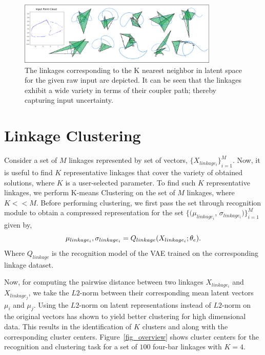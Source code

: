 \begin{figure}
\centering
\includegraphics[width=0.85\textwidth]{idetc-20/figure/fig_knn_latent.eps}
  \caption{The linkages corresponding to the K nearest neighbor in latent space for the given raw input are depicted. It can be seen that the linkages exhibit a wide variety in terms of their coupler path; thereby capturing input uncertainty.}
\label{fig_knn_latent}
\end{figure}

\section{Linkage Clustering}\label{subsec_vae_for_ln}
Consider a set of $M$ linkages represented by set of vectors, ${\{X_{linkage_{i}}\}}_{i=1}^{M}$.
Now, it is useful to find $K$ representative linkages that cover the variety of obtained solutions, where $K$ is a user-selected parameter.
To find such $K$ representative linkages, we perform K-means\cite{lloyd1982kmeans} Clustering on the set of $M$ linkages, where $K << M$.
Before performing clustering, we first pass the set through recognition module to obtain a compressed representation for the set $\{(\mu_{linkage_i}$, $\sigma_{linkage_i})\}_{i=1}^M$ given by,
\begin{equation}\label{eq_recogn_linkage}
  \mu_{linkage_i}, \sigma_{linkage_i} = Q_{linkage}(X_{linkage_i}; \theta_e).\\
\end{equation}
Where $Q_{linkage}$ is the recognition model of the VAE trained on the corresponding linkage dataset.

Now, for computing the pairwise distance between two linkages $X_{linkage_i}$ and $X_{linkage_j}$, we take the $L2$-norm between their corresponding mean latent vectors $\mu_i$ and $\mu_j$.
Using the $L2$-norm on latent representations instead of $L2$-norm on the original vectors has shown to yield better clustering for high dimensional data\cite{song2013}.
This results in the identification of $K$ clusters and along with the corresponding cluster centers.
Figure~\ref{fig_overview} shows cluster centers for the recognition and clustering task for a set of $100$ four-bar linkages with $K = 4$.
